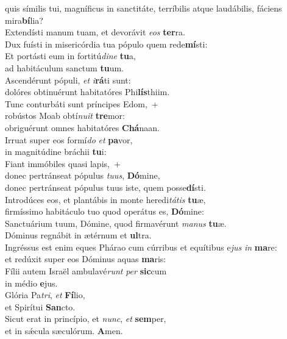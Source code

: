 \evenverse quis símilis tui, magníficus in sanctitáte, terríbilis atque laudábilis, fáciens mira\textbf{bí}lia?\\
\oddverse Extendísti manum tuam, et devorávit \textit{e}\textit{os} \textbf{ter}ra.~\*\\
\oddverse Dux fuísti in misericórdia tua pópulo quem rede\textbf{mí}sti:\\
\evenverse Et portásti eum in fortitú\textit{di}\textit{ne} \textbf{tu}a,~\*\\
\evenverse ad habitáculum sanctum \textbf{tu}um.\\
\oddverse Ascendérunt pópuli, \textit{et} \textit{i}\textbf{rá}ti sunt:~\*\\
\oddverse dolóres obtinuérunt habitatóres Phi\textbf{lís}thiim.\\
\evenverse Tunc conturbáti sunt príncipes Edom,~+\\
\evenverse  robústos Moab obtí\textit{nu}\textit{it} \textbf{tre}mor:~\*\\
\evenverse obriguérunt omnes habitatóres \textbf{Chá}naan.\\
\oddverse Irruat super eos formí\textit{do} \textit{et} \textbf{pa}vor,~\*\\
\oddverse in magnitúdine bráchii \textbf{tu}i:\\
\evenverse Fiant immóbiles quasi lapis,~+\\
\evenverse  donec pertránseat pópulus \textit{tu}\textit{us}, \textbf{Dó}mine,~\*\\
\evenverse donec pertránseat pópulus tuus iste, quem posse\textbf{dí}sti.\\
\oddverse Introdúces eos, et plantábis in monte heredi\textit{tá}\textit{tis} \textbf{tu}æ,~\*\\
\oddverse firmíssimo habitáculo tuo quod operátus es, \textbf{Dó}mine:\\
\evenverse Sanctuárium tuum, Dómine, quod firmavérunt \textit{ma}\textit{nus} \textbf{tu}æ.~\*\\
\evenverse Dóminus regnábit in ætérnum et \textbf{ul}tra.\\
\oddverse Ingréssus est enim eques Phárao cum cúrribus et equítibus e\textit{jus} \textit{in} \textbf{ma}re:~\*\\
\oddverse et redúxit super eos Dóminus aquas \textbf{ma}ris:\\
\evenverse Fílii autem Israël ambulavé\textit{runt} \textit{per} \textbf{sic}cum~\*\\
\evenverse in médio \textbf{e}jus.\\
\oddverse Glória Pa\textit{tri}, \textit{et} \textbf{Fí}lio,~\*\\
\oddverse et Spirítui \textbf{San}cto.\\
\evenverse Sicut erat in princípio, et \textit{nunc}, \textit{et} \textbf{sem}per,~\*\\
\evenverse et in sǽcula sæculórum. \textbf{A}men.\\
